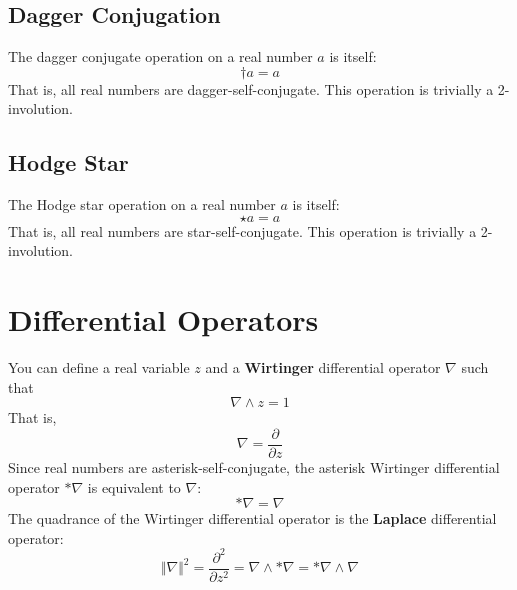 \subsection{Dagger Conjugation}
The dagger conjugate operation on a real number $a$ is itself:
\begin{equation}
    {\dagger a} = a
\end{equation}
That is, all real numbers are dagger-self-conjugate. This operation is trivially a 2-involution.
\subsection{Hodge Star}
The Hodge star operation on a real number $a$ is itself:
\begin{equation}
    {\star a} = a
\end{equation}
That is, all real numbers are star-self-conjugate. This operation is trivially a 2-involution.
\section{Differential Operators}
You can define a real variable $z$ and a \textbf{Wirtinger} differential operator $\nabla$ such that
\begin{equation}
    \nabla \wedge z = 1
\end{equation}
That is,
\begin{equation}
    \nabla = \frac{\partial}{\partial z}
\end{equation}
Since real numbers are asterisk-self-conjugate, the asterisk Wirtinger differential operator ${\ast \nabla}$ is equivalent to $\nabla$:
\begin{equation}
    {\ast \nabla} = \nabla
\end{equation}
The quadrance of the Wirtinger differential operator is the \textbf{Laplace} differential operator:
\begin{equation}
    \Vert \nabla \Vert^{2} = \frac{\partial^{2}}{\partial z^{2}} = \nabla \wedge {\ast \nabla} = {\ast \nabla} \wedge \nabla
\end{equation}